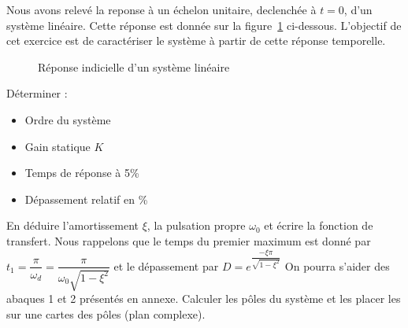 
Nous avons relevé la reponse à un échelon unitaire, 
declenchée à $t=0$, d'un système linéaire.
Cette réponse est donnée sur la figure~\ref{fig-2nd} ci-dessous.
L'objectif de cet exercice est de caractériser le système 
à partir de cette réponse temporelle.
\begin{figure}[!h]
    \centering
    
    \caption{Réponse indicielle d'un système linéaire\label{fig-2nd}}
\end{figure}
\question{}
Déterminer :
\begin{itemize}
    \item Ordre du système
    \item Gain statique $K$
    \item Temps de réponse à 5\%
    \item Dépassement relatif en \%
\end{itemize}
\question{}
En déduire l'amortissement $\xi$, la pulsation propre $\omega_0$ et écrire 
la fonction de transfert. Nous rappelons que le temps du premier maximum est 
donné par $t_1=\dfrac{\pi}{\omega_d}=\dfrac{\pi}{\omega_0\sqrt{1-\xi^2}}$
et le dépassement par $D=e^{\dfrac{-\xi\pi}{\sqrt{1-\xi^2}}}$
On pourra s'aider des abaques 1 et 2 présentés en annexe.
\question{}
Calculer les pôles du système et les placer les sur une cartes des 
pôles (plan complexe).
